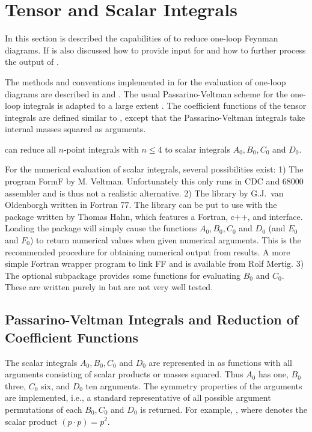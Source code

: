 \section{Tensor and Scalar Integrals}

In this section is described the capabilities of \fc to reduce one-loop Feynman diagrams.
If is also discussed how to provide input for \fc and how to further process the output of \fc.

The methods and conventions implemented in \fc for the evaluation of one-loop diagrams are
described in \cite{ansgar} and \cite{feyncalc}. The usual Passarino-Veltman scheme for the
one-loop integrals is adapted to a large extent \cite{ansgar}.  The coefficient functions of the
tensor integrals are defined  similar to \cite{ansgar}, except that the Passarino-Veltman
integrals take internal masses squared  as arguments.

\fc can reduce all $n$-point integrals with $n\leq 4$ to scalar integrals $A_0, B_0, C_0$ and
$D_0$.

For the numerical evaluation of scalar integrals, several possibilities exist: 1) The program
FormF by M. Veltman. Unfortunately this only runs in CDC and 68000 assembler and is thus not a
realistic alternative. 2) The library \FF by G.J.~van Oldenborgh \cite{Ol91} written in Fortran
77. The library can be put to use with the \lpts package \cite{Hahn:1998yk} written by Thomas
Hahn, which features a Fortran, c++, and \mma interface. Loading the \mma package will simply
cause the functions $A_0, B_0, C_0$ and $D_0$ (and $E_0$ and $F_0$) to return numerical values
when given numerical arguments. This is the recommended procedure for obtaining numerical output
from \fc results. A more simple Fortran wrapper program to link FF and \fc is available from Rolf
Mertig. 3) The optional subpackage \fphi provides some functions for evaluating $B_0$ and $C_0$.
These are written purely in \mma but are not very well tested.

\subsection{Passarino-Veltman Integrals and Reduction of Coefficient Functions}
\label{passvelt}

The scalar integrals $A_0, B_0, C_0$ and $D_0$ are represented
in \fc as functions with all arguments consisting of scalar products or 
masses squared. Thus $A_0$ has one, $B_0$ three, $C_0$ six, and 
$D_0$ ten arguments. The symmetry properties of the arguments  are 
implemented, i.e., a standard representative of all possible 
argument permutations of each $ B_0, C_0$ and $D_0$ is returned.
For example,  \ra {}, where 
 denotes the scalar product $(p\cdot p) = p^2$.


